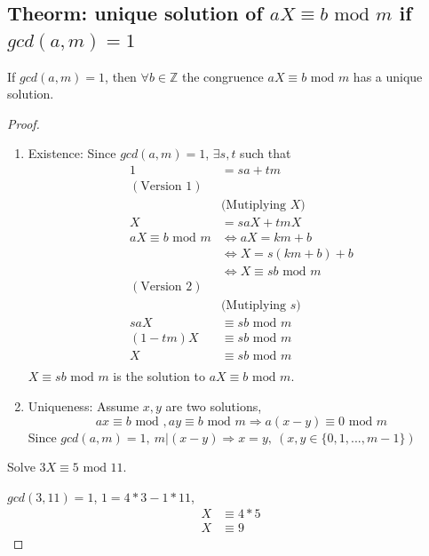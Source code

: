 \documentclass[11pt]{elegantbook}
\begin{document}
\subsection{Theorm: unique solution of $aX\equiv b \text{ mod }m$ if $gcd(a,m)=1$}
\begin{theorem}
If $gcd(a,m)=1$, then $\forall b\in \mathbb{Z}$ the congruence $aX\equiv b \text{ mod }m$ has a unique solution.
\end{theorem}
\begin{proof}
\quad

\begin{enumerate}[1)]
    \item Existence: Since $gcd(a,m)=1$, $\exists s,t$ such that
    \begin{equation}
        \begin{aligned}
        1&=sa+tm\\
        (\text{Version 1})&\\
        &\text{(Mutiplying $X$)}\\
        X&=saX+tmX\\
        aX\equiv b \text{ mod }m &\Leftrightarrow aX=km+b\\
        &\Leftrightarrow X=s(km+b)+b\\
        &\Leftrightarrow X\equiv sb \text{ mod }m\\
        (\text{Version 2})&\\
        &\text{(Mutiplying $s$)}\\
        saX&\equiv sb \text{ mod }m\\
        (1-tm)X&\equiv sb \text{ mod }m\\
        X&\equiv sb \text{ mod }m\\
        \end{aligned}
        \nonumber
    \end{equation}
    $X\equiv sb \text{ mod }m$ is the solution to $aX\equiv b \text{ mod }m$.
    \item Uniqueness: Assume $x,y$ are two solutions, $$ax\equiv b \text{ mod },ay\equiv b \text{ mod } m\Rightarrow	a(x-y)\equiv 0 \text{ mod }m$$
    Since $gcd(a,m)=1,\ m|(x-y)\Rightarrow x=y,\ (x,y\in\{0,1,...,m-1\})$
\end{enumerate}
\begin{example}
Solve $3X\equiv 5 \text{ mod }11$.
\end{example}
$gcd(3,11)=1$, $1=4*3-1*11$, 
\begin{equation}
    \begin{aligned}
        X&\equiv 4*5\\
        X&\equiv 9
    \end{aligned}
    \nonumber
\end{equation}

\end{proof}
\end{document}
